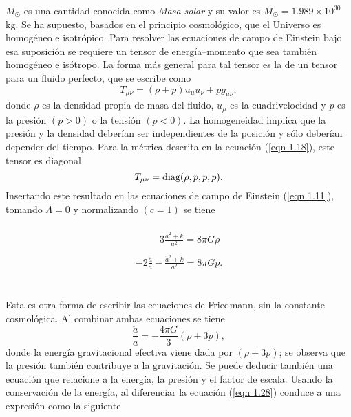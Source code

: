 \documentclass[a4paper,openright,12pt]{book}
\begin{document}
$M_{\odot}$ es una cantidad conocida como \textit{Masa solar} y su valor es $M_{\odot} = 1.989 \times 10^{30}$kg. Se ha supuesto, basados en el principio cosmológico, que el Universo es homogéneo e isotrópico. Para resolver las ecuaciones de campo de Einstein bajo esa suposición se requiere un tensor de energía--momento que sea también homogéneo e isótropo. La forma más general para tal tensor es la de un tensor para un fluido perfecto, que se escribe como \cite{1.2, 1.3}
\begin{equation}
T_{\mu \nu} =
(\rho + p)u_{\mu}u_{\nu} + pg_{\mu \nu},\label{eqn 1.26}
\end{equation}
donde $\rho$ es la densidad propia de masa del fluido, $u_{\mu}$ es la cuadrivelocidad y $p$ es la presión $(p > 0)$ o la tensión $(p < 0)$. La homogeneidad implica que la presión y la densidad deberían ser independientes de la posición y sólo deberían depender del tiempo. Para la métrica descrita en la ecuación (\ref{eqn 1.18}), este tensor es diagonal 
\begin{equation}
T_{\mu \nu} = \textup{diag}(\rho, p, p, p).\label{eqn 1.27}
\end{equation}
Insertando este resultado en las ecuaciones de campo de Einstein (\ref{eqn 1.11}), tomando $\Lambda = 0$ y normalizando $(c = 1)$ se tiene\\\\
\begin{equation}
\begin{array}{ll}
\;\;\;\;\;\;\;\;\; 3\frac{\dot{a}^{2} + k}{a^{2}}  = 8 \pi G \rho \\\\
-2\frac{\ddot{a}}{a} - \frac{\dot{a}^{2} + k}{a^{2}}= 8 \pi G p.
\end{array}\label{eqn 1.28}
\end{equation}\\\\
Esta es otra forma de escribir las ecuaciones de Friedmann, sin la constante cosmológica. Al combinar ambas ecuaciones se tiene
\begin{equation}
\frac{\ddot{a}}{a} = -\frac{4 \pi G}{3}(\rho + 3p), \label{eqn 1.29}
\end{equation}
donde la energía gravitacional efectiva viene dada por $(\rho + 3p)$; se observa que la presión también contribuye a la gravitación. Se puede deducir también una ecuación que relacione a la energía, la presión y el factor de escala. Usando la conservación de la energía, al diferenciar la ecuación (\ref{eqn 1.28}) conduce a una expresión como la siguiente
\end{document}
